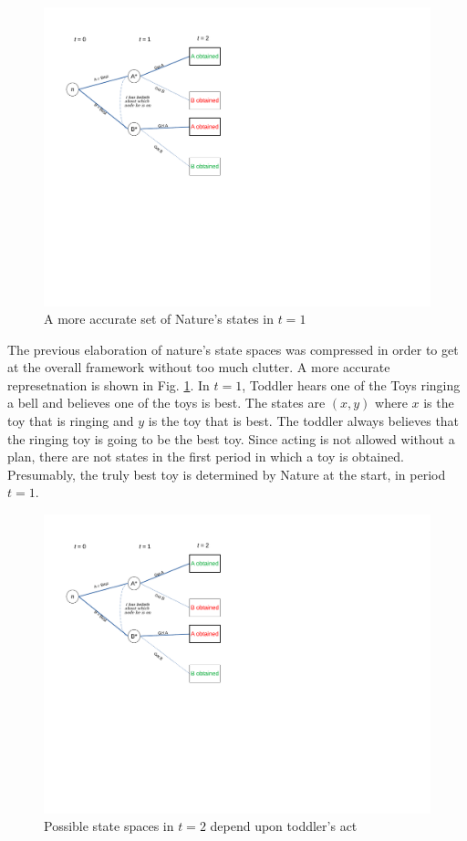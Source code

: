 \documentclass[
11pt,
titlepage,
reqno,
]{article}%
\theoremstyle{definition}
\begin{document}
\begin{figure}[h!]
	\centering
	\includegraphics*[page=15,trim = 0in 7in 6in 0in,scale=1]{Awareness_Diagrams_All}
	\caption{A more accurate set of Nature's states in $t=1$\label{Diag: p-15}}%
\end{figure}

The previous elaboration of nature's state spaces was compressed in order to get at the overall framework without too much clutter. A more accurate represetnation is shown in Fig. \ref{Diag: p-15}. In $t=1$, Toddler hears one of the Toys ringing a bell and believes one of the toys is best. The states are $(x,y)$ where $x$ is the toy that is ringing and $y$ is the toy that is best. The toddler always believes that the ringing toy is going to be the best toy. Since acting is not allowed without a plan, there are not states in the first period in which a toy is obtained. Presumably, the truly best toy is determined by Nature at the start, in period $t=1$.

\begin{figure}[h!]
	\centering
	\includegraphics*[page=16,trim = 0in 5in 1in 0in,scale=.65]{Awareness_Diagrams_All}
	\caption{Possible state spaces in $t=2$ depend upon toddler's act\label{Diag: p-16}}%
\end{figure}
\end{document}
